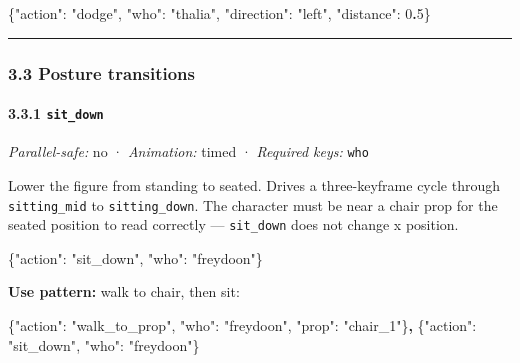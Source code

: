 \documentclass[
  11pt,
]{book}
\newenvironment{Shaded}{}{}
\newcommand{\DataTypeTok}[1]{\textcolor[rgb]{0.56,0.13,0.00}{#1}}
\newcommand{\DecValTok}[1]{\textcolor[rgb]{0.25,0.63,0.44}{#1}}
\newcommand{\ErrorTok}[1]{\textcolor[rgb]{1.00,0.00,0.00}{\textbf{#1}}}
\newcommand{\FunctionTok}[1]{\textcolor[rgb]{0.02,0.16,0.49}{#1}}
\newcommand{\StringTok}[1]{\textcolor[rgb]{0.25,0.44,0.63}{#1}}
\begin{document}
\begin{Shaded}
\begin{Highlighting}[]
\FunctionTok{\{}\DataTypeTok{"action"}\FunctionTok{:} \StringTok{"dodge"}\FunctionTok{,} \DataTypeTok{"who"}\FunctionTok{:} \StringTok{"thalia"}\FunctionTok{,} \DataTypeTok{"direction"}\FunctionTok{:} \StringTok{"left"}\FunctionTok{,} \DataTypeTok{"distance"}\FunctionTok{:} \DecValTok{0}\ErrorTok{.}\DecValTok{5}\FunctionTok{\}}
\end{Highlighting}
\end{Shaded}

\begin{center}\rule{0.5\linewidth}{0.5pt}\end{center}

\subsubsection{3.3 Posture transitions}\label{posture-transitions}

\paragraph{\texorpdfstring{3.3.1
\texttt{sit\_down}}{3.3.1 sit\_down}}\label{sit_down}

\emph{Parallel-safe:} no · \emph{Animation:} timed · \emph{Required
keys:} \texttt{who}

Lower the figure from standing to seated. Drives a three-keyframe cycle
through \texttt{sitting\_mid} to \texttt{sitting\_down}. The character
must be near a chair prop for the seated position to read correctly ---
\texttt{sit\_down} does not change x position.

\begin{Shaded}
\begin{Highlighting}[]
\FunctionTok{\{}\DataTypeTok{"action"}\FunctionTok{:} \StringTok{"sit\_down"}\FunctionTok{,} \DataTypeTok{"who"}\FunctionTok{:} \StringTok{"freydoon"}\FunctionTok{\}}
\end{Highlighting}
\end{Shaded}

\textbf{Use pattern:} walk to chair, then sit:

\begin{Shaded}
\begin{Highlighting}[]
\FunctionTok{\{}\DataTypeTok{"action"}\FunctionTok{:} \StringTok{"walk\_to\_prop"}\FunctionTok{,} \DataTypeTok{"who"}\FunctionTok{:} \StringTok{"freydoon"}\FunctionTok{,} \DataTypeTok{"prop"}\FunctionTok{:} \StringTok{"chair\_1"}\FunctionTok{\}}\ErrorTok{,}
\FunctionTok{\{}\DataTypeTok{"action"}\FunctionTok{:} \StringTok{"sit\_down"}\FunctionTok{,} \DataTypeTok{"who"}\FunctionTok{:} \StringTok{"freydoon"}\FunctionTok{\}}
\end{Highlighting}
\end{Shaded}
\end{document}
